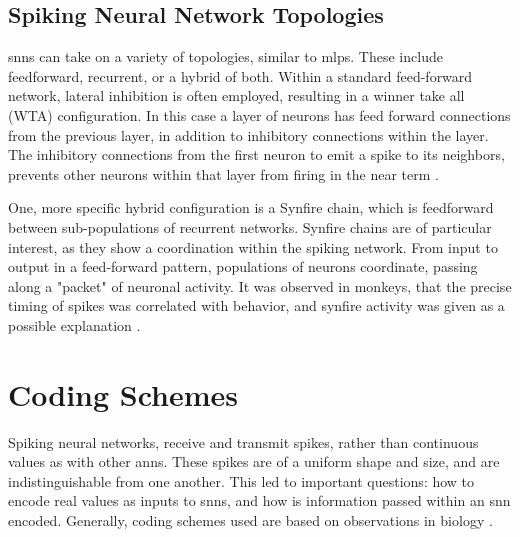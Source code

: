 
    
    \subsection{Spiking Neural Network Topologies}
    \glspl{snn} can take on a variety of topologies, similar to
    \glspl{mlp}. These include feedforward, recurrent, or a hybrid of
    both. Within a standard feed-forward network, lateral inhibition is often
    employed, resulting in a winner take all (WTA) configuration. In this case a
    layer of neurons has feed forward connections from the previous layer, in
    addition to inhibitory connections within the layer. The inhibitory
    connections from the first neuron to emit a spike to its neighbors, prevents
    other neurons within that layer from firing in the near term
    \parencite{ponulak_2011}.
    
    One, more specific hybrid configuration is a Synfire chain, which is
    feedforward between sub-populations of recurrent networks. Synfire chains
    are of particular interest, as they show a coordination within the spiking
    network. From input to output in a feed-forward pattern, populations of
    neurons coordinate, passing along a "packet" of neuronal activity. It was
    observed in monkeys, that the precise timing of spikes was correlated with
    behavior, and synfire activity was given as a possible explanation
    \parencite{aertsen_1996}.
    
    \section{Coding Schemes}
    Spiking neural networks, receive and transmit spikes, rather than continuous
    values as with other \glspl{ann}. These spikes are of a uniform shape and
    size, and are indistinguishable from one another. This led to important
    questions: how to encode real values as inputs to \glspl{snn}, and how is
    information passed within an \gls{snn} encoded. Generally, coding schemes
    used are based on observations in biology \parencite{ponulak_2011}.
    
